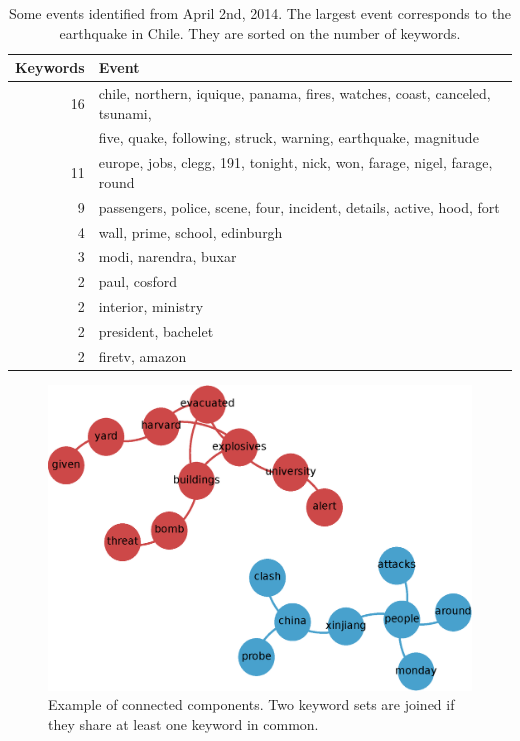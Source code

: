 \begin{table}
\begin{center}
\begin{tabular}{rl}
\toprule
 Keywords  &  Event                                                                        \\
\midrule
       16  &  chile, northern, iquique, panama, fires, watches, coast, canceled, tsunami,  \\
           &  five, quake, following, struck, warning, earthquake, magnitude               \\
       11  &  europe, jobs, clegg, 191, tonight, nick, won, farage, nigel, farage, round   \\
        9  &  passengers, police, scene, four, incident, details, active, hood, fort       \\
        4  &  wall, prime, school, edinburgh                                               \\
        3  &  modi, narendra, buxar                                                        \\
        2  &  paul, cosford                                                                \\
        2  &  interior, ministry                                                           \\
        2  &  president, bachelet                                                          \\
        2  &  firetv, amazon                                                               \\
\bottomrule
\end{tabular}
\end{center}

\caption[Some events identified from April 2nd, 2014.]{Some events
  identified from April 2nd, 
  2014. The largest event corresponds to the earthquake in Chile. They
  are sorted on the number of keywords.}\label{table:example-events}
\end{table}

\begin{figure}
    \centering
    \includegraphics[width=.6\textwidth]{figures/data/connected_components.eps}
    \caption[Example of connected components]
    {Example of connected components. Two keyword sets are joined if they share
    at least one keyword in common.}\label{fig:connected-component}
\end{figure}




